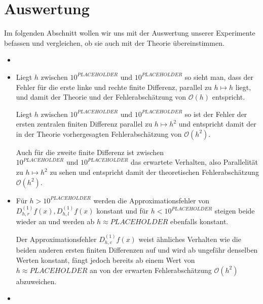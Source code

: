 \documentclass{scrartcl}
\newcommand{\BigO}{\mathcal{O}}
\theoremstyle{remark}
\begin{document}


\section{Auswertung}
Im folgenden Abschnitt wollen wir uns mit der Auswertung unserer Experimente
befassen und vergleichen, ob sie auch mit der Theorie übereinstimmen.


\begin{itemize}
    \item %

    \item Liegt \(h\) zwischen \(10^{ PLACEHOLDER } \text{ und } 10^{
          PLACEHOLDER } \) so sieht man, dass der Fehler für die erste linke
          und rechte finite Differenz, parallel zu \(h \mapsto h\) liegt, und
          damit der Theorie und der Fehlerabschätzung von \(\BigO(h)\)
          entspricht.

          Liegt \(h\) zwischen \(10^{ PLACEHOLDER } \text{ und } 10^{
          PLACEHOLDER } \) so ist der Fehler der ersten zentralen finiten
          Differenz parallel zu \(h \mapsto h^2\) und entspricht damit der in
          der Theorie vorhergesagten Fehlerabschätzung von \(\BigO(h^2)\).

          Auch für die zweite finite Differenz ist zwischen \(10^{ PLACEHOLDER
          } \text{ und } 10^{ PLACEHOLDER }\) das erwartete Verhalten, also
          Parallelität zu \(h \mapsto h^2\) zu sehen und entspricht damit der
          theoretischen Fehlerabschätzung \(\BigO(h^2)\).

    \item Für \(h > 10^{ PLACEHOLDER } \) werden die Approximationsfehler von
          \(D_{h, r}^{(1)}f(x), D_{h, l}^{(1)}f(x)\) konstant und für \(h <
          10^{ PLACEHOLDER } \) steigen beide wieder an und werden ab \(h
          \approx PLACEHOLDER \) ebenfalls konstant.

          Der Approximationsfehler \(D_{h, c}^{(1)}f(x)\) weist ähnliches
          Verhalten wie die beiden anderen ersten finiten Differenzen auf und
          wird ab ungefähr denselben Werten konstant, fängt jedoch bereits ab
          einem Wert von \(h \approx PLACEHOLDER\) an von der erwarten
          Fehlerabschätzung \(\BigO(h^{2})\) abzuweichen. \item
\end{itemize}
\end{document}
